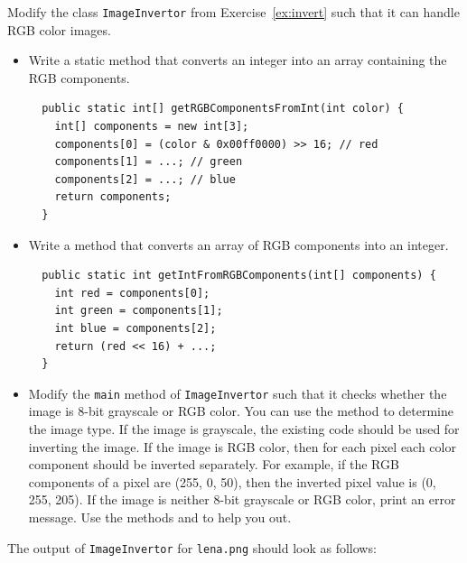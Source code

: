 \documentclass{book}
\begin{document}
\begin{exercise}
Modify the class \texttt{ImageInvertor} from Exercise~\ref{ex:invert} such that it can handle RGB color images.
\begin{itemize}
  \item Write a static method  that converts an integer into an array containing the RGB components.
  \begin{lstlisting}
  public static int[] getRGBComponentsFromInt(int color) {
    int[] components = new int[3];
    components[0] = (color & 0x00ff0000) >> 16; // red
    components[1] = ...; // green
    components[2] = ...; // blue
    return components;
  }
  \end{lstlisting}
  \item Write a method  that converts an array of RGB components into an integer.
  \begin{lstlisting}
  public static int getIntFromRGBComponents(int[] components) {
    int red = components[0];
    int green = components[1];
    int blue = components[2];
    return (red << 16) + ...;  
  }
  \end{lstlisting}
  \item Modify the \texttt{main} method of \texttt{ImageInvertor}  such that it checks whether the image is 8-bit grayscale or RGB color. You can use the method  to determine the image type. If the image is grayscale, the existing code should be used for inverting the image. If the image is RGB color, then for each pixel each color component should be inverted separately. For example, if the RGB components of a pixel are (255, 0, 50), then the inverted pixel value is (0, 255, 205). If the image is neither 8-bit grayscale or RGB color, print an error message. Use the methods  and  to help you out.
\end{itemize}
The output of \texttt{ImageInvertor} for \texttt{lena.png} should look as follows:
\begin{center}

\end{center}
\end{exercise}
\end{document}
